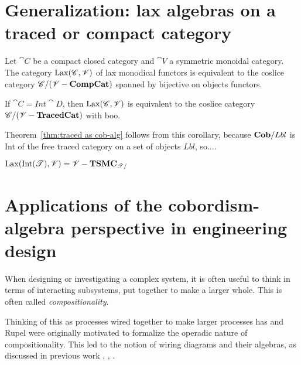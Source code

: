\section{Generalization: lax algebras on a traced or compact category}

\begin{theorem}
 Let $\cat{C}$ be a compact closed category and $\cat{V}$ a symmetric monoidal category.  The category $\operatorname{Lax}(\mathscr{C},\mathscr{V})$ of lax monodical functors is equivalent to the coslice category $\mathscr{C}/(\mathscr{V}-\mathbf{CompCat})$ spanned by bijective on objects functors.
\end{theorem}

\begin{corollary}
If $\cat{C}=Int\cat{D}$, then $\operatorname{Lax}(\mathscr{C},\mathscr{V})$ is equivalent to the coslice category $\mathscr{C}/(\mathscr{V}-\mathbf{TracedCat})$ with boo.
\end{corollary}

Theorem~\ref{thm:traced as cob-alg} follows from this corollary, because $\mathbf{Cob}/Lbl$ is Int of the free traced category on a set of objects $Lbl$, so....

\begin{corollary}
 $\operatorname{Lax}(\operatorname{Int}(\mathscr{T}),\mathscr{V})=\mathscr{V}-\mathbf{TSMC}_{\mathscr{T}/}$
\end{corollary}

\section[Applications of the cobordism-algebra perspective]{Applications of the cobordism-algebra perspective in engineering design}

When designing or investigating a complex system, it is often useful to think in terms of interacting subsystems, put together to make a larger whole. This is often called \emph{compositionality}.

Thinking of this as processes wired together to make larger processes has and Rupel were originally motivated to formalize the operadic nature of compositionality. This led to the notion of wiring diagrams and their algebras, as discussed in previous work \cite{Spivak}, \cite{Rupel-Spivak}, \cite{Vagner-Spivak-Lerman}. 
 

